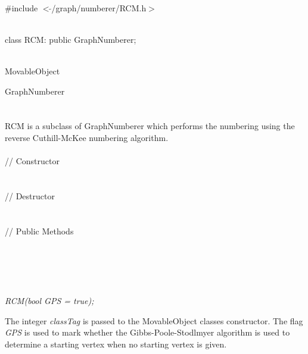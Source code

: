 

   \\
\#include $<\tilde{ }$/graph/numberer/RCM.h$>$  


  \\
class RCM: public GraphNumberer; 


 \\
MovableObject 

\indent\indent GraphNumberer \\
\indent\indent{} \\

  \\
\indent RCM is a subclass of GraphNumberer which performs the
numbering using the reverse Cuthill-McKee numbering algorithm. \\

  \\
\indent\indent // Constructor  \\
\indent{}  \\ \\
\indent\indent // Destructor  \\
\indent{}  \\ \\
\indent\indent // Public Methods   \\
\indent{}\\
\indent{}\\
\indent{} \\
\indent{} \\

  \\
{\em RCM(bool GPS = true);}  

The integer {\em classTag} is passed to the MovableObject classes
constructor. The flag {\em GPS} is used to mark whether the
Gibbs-Poole-Stodlmyer algorithm is used to determine a starting vertex
when no starting vertex is given. \\

